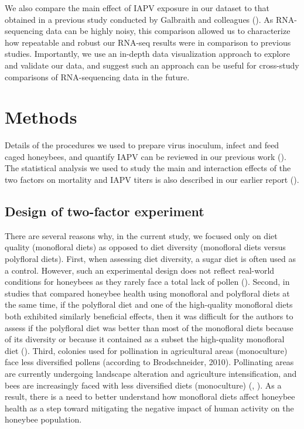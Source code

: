 \documentclass[11pt,a4paper,oldfontcommands,openany]{memoir}
\numberwithin{equation}{section} %
\begin{document}
We also compare the main effect of IAPV exposure in our dataset to that obtained in a previous study conducted by Galbraith and colleagues (\citealt{galbraith}). As RNA-sequencing data can be highly noisy, this comparison allowed us to characterize how repeatable and robust our RNA-seq results were in comparison to previous studies. Importantly, we use an in-depth data visualization approach to explore and validate our data, and suggest such an approach can be useful for cross-study comparisons of RNA-sequencing data in the future.

\section{Methods}

Details of the procedures we used to prepare virus inoculum, infect and feed caged honeybees, and quantify IAPV can be reviewed in our previous work (\citealt{adamInt}). The statistical analysis we used to study the main and interaction effects of the two factors on mortality and IAPV titers is also described in our earlier report (\citealt{adamInt}).

\subsection{Design of two-factor experiment}

There are several reasons why, in the current study, we focused only on diet quality (monofloral diets) as opposed to diet diversity (monofloral diets versus polyfloral diets). First, when assessing diet diversity, a sugar diet is often used as a control. However, such an experimental design does not reflect real-world conditions for honeybees as they rarely face a total lack of pollen (\citealt{DiPasquale}). Second, in studies that compared honeybee health using monofloral and polyfloral diets at the same time, if the polyfloral diet and one of the high-quality monofloral diets both exhibited similarly beneficial effects, then it was difficult for the authors to assess if the polyfloral diet was better than most of the monofloral diets because of its diversity or because it contained as a subset the high-quality monofloral diet (\citealt{DiPasquale}). Third, colonies used for pollination in agricultural areas (monoculture) face less diversified pollens (according to Brodschneider, 2010). Pollinating areas are currently undergoing landscape alteration and agriculture intensification, and bees are increasingly faced with less diversified diets (monoculture) (\citealt{landscape1}, \citealt{brodschneider}). As a result, there is a need to better understand how monofloral diets affect honeybee health as a step toward mitigating the negative impact of human activity on the honeybee population.
\end{document}
